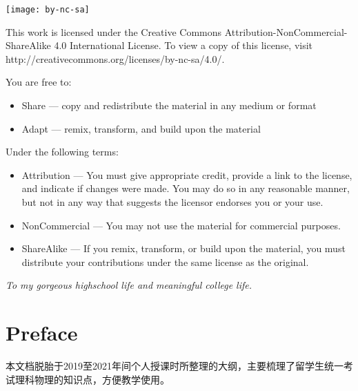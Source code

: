 \clearpage
\begin{flushleft}
    \null

    \vfill
    \texttt{[image: by-nc-sa]}

    This work is licensed under the Creative Commons Attribution-NonCommercial-ShareAlike 4.0 International License. To view a copy of this license, visit http://creativecommons.org/licenses/by-nc-sa/4.0/.

    \vspace{1em}
    You are free to:
    \begin{itemize}
        \item Share — copy and redistribute the material in any medium or format
        \item Adapt — remix, transform, and build upon the material
    \end{itemize}

    Under the following terms:
    \begin{itemize}
        \item Attribution — You must give appropriate credit, provide a link to the license, and indicate if changes were made. You may do so in any reasonable manner, but not in any way that suggests the licensor endorses you or your use.
        \item NonCommercial — You may not use the material for commercial purposes.
        \item ShareAlike — If you remix, transform, or build upon the material, you must distribute your contributions under the same license as the original.
    \end{itemize}
\end{flushleft}


\clearpage
\begin{center}
    \null

    \vspace{0.382\textheight}
    \textit{\large
        To my gorgeous highschool life
        and meaningful college life.
    }
\end{center}


\clearpage
\chapter*{Preface}

本文档脱胎于2019至2021年间个人授课时所整理的大纲，主要梳理了留学生统一考试理科物理的知识点，方便教学使用。


